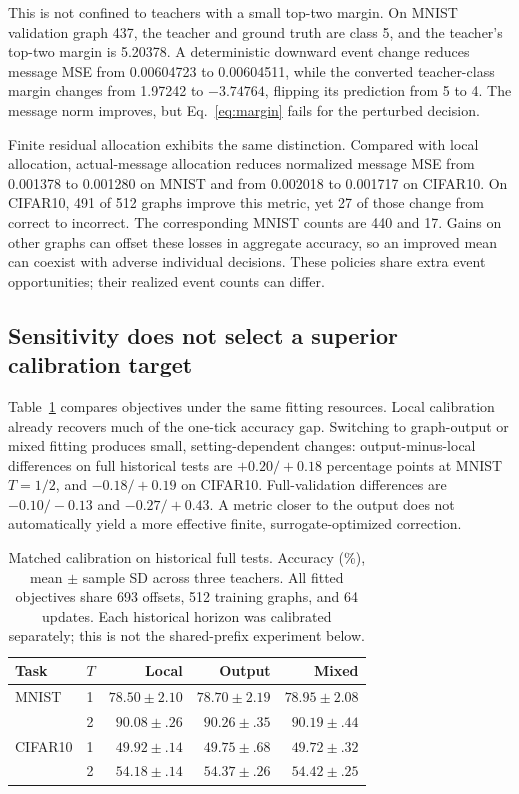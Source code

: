 \documentclass[10pt,twocolumn,letterpaper]{article}
\begin{document}
This is not confined to teachers with a small top-two margin. On MNIST validation graph 437, the teacher and ground truth are class 5, and the teacher's top-two margin is 5.20378. A deterministic downward event change reduces message MSE from 0.00604723 to 0.00604511, while the converted teacher-class margin changes from 1.97242 to $-3.74764$, flipping its prediction from 5 to 4. The message norm improves, but Eq.~\eqref{eq:margin} fails for the perturbed decision.

Finite residual allocation exhibits the same distinction. Compared with local allocation, actual-message allocation reduces normalized message MSE from 0.001378 to 0.001280 on MNIST and from 0.002018 to 0.001717 on CIFAR10. On CIFAR10, 491 of 512 graphs improve this metric, yet 27 of those change from correct to incorrect. The corresponding MNIST counts are 440 and 17. Gains on other graphs can offset these losses in aggregate accuracy, so an improved mean can coexist with adverse individual decisions. These policies share extra event opportunities; their realized event counts can differ.

\subsection{Sensitivity does not select a superior calibration target}
Table~\ref{tab:calibration} compares objectives under the same fitting resources. Local calibration already recovers much of the one-tick accuracy gap. Switching to graph-output or mixed fitting produces small, setting-dependent changes: output-minus-local differences on full historical tests are $+0.20/+0.18$ percentage points at MNIST $T=1/2$, and $-0.18/+0.19$ on CIFAR10. Full-validation differences are $-0.10/-0.13$ and $-0.27/+0.43$. A metric closer to the output does not automatically yield a more effective finite, surrogate-optimized correction.

\begin{table}[t]
\caption{Matched calibration on historical full tests. Accuracy (\%), mean $\pm$ sample SD across three teachers. All fitted objectives share 693 offsets, 512 training graphs, and 64 updates. Each historical horizon was calibrated separately; this is not the shared-prefix experiment below.}
\label{tab:calibration}
\centering\small\setlength{\tabcolsep}{3pt}
\begin{tabular}{llrrr}\toprule
Task & $T$ & Local & Output & Mixed\\\midrule
MNIST & 1 & $78.50\pm2.10$ & $78.70\pm2.19$ & $78.95\pm2.08$\\
 & 2 & $90.08\pm.26$ & $90.26\pm.35$ & $90.19\pm.44$\\
CIFAR10 & 1 & $49.92\pm.14$ & $49.75\pm.68$ & $49.72\pm.32$\\
 & 2 & $54.18\pm.14$ & $54.37\pm.26$ & $54.42\pm.25$\\\bottomrule
\end{tabular}
\end{table}
\end{document}
